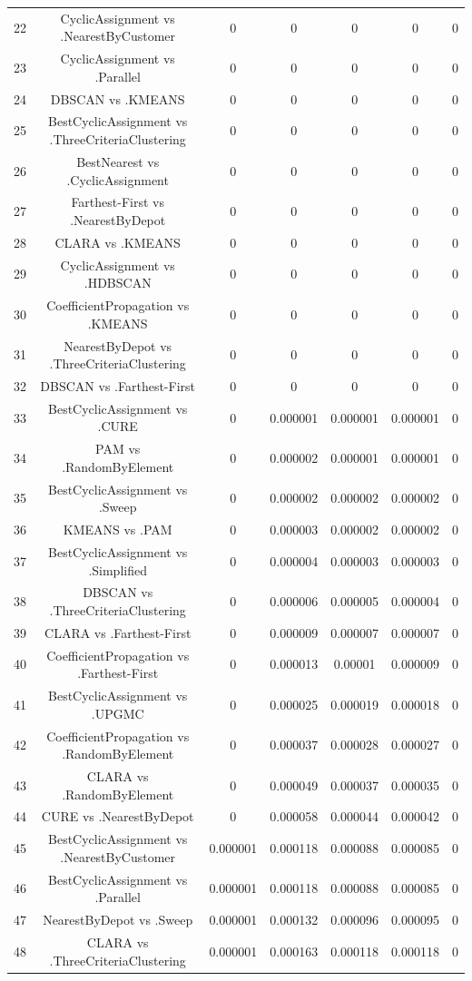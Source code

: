 \documentclass[a4paper,10pt]{article}
\begin{document}
\begin{landscape}
\begin{table}[!htp]
\begin{tabular}{ccccccc}
22&CyclicAssignment vs .NearestByCustomer&0&0&0&0&0\\
23&CyclicAssignment vs .Parallel&0&0&0&0&0\\
24&DBSCAN vs .KMEANS&0&0&0&0&0\\
25&BestCyclicAssignment vs .ThreeCriteriaClustering&0&0&0&0&0\\
26&BestNearest vs .CyclicAssignment&0&0&0&0&0\\
27&Farthest-First vs .NearestByDepot&0&0&0&0&0\\
28&CLARA vs .KMEANS&0&0&0&0&0\\
29&CyclicAssignment vs .HDBSCAN&0&0&0&0&0\\
30&CoefficientPropagation vs .KMEANS&0&0&0&0&0\\
31&NearestByDepot vs .ThreeCriteriaClustering&0&0&0&0&0\\
32&DBSCAN vs .Farthest-First&0&0&0&0&0\\
33&BestCyclicAssignment vs .CURE&0&0.000001&0.000001&0.000001&0\\
34&PAM vs .RandomByElement&0&0.000002&0.000001&0.000001&0\\
35&BestCyclicAssignment vs .Sweep&0&0.000002&0.000002&0.000002&0\\
36&KMEANS vs .PAM&0&0.000003&0.000002&0.000002&0\\
37&BestCyclicAssignment vs .Simplified&0&0.000004&0.000003&0.000003&0\\
38&DBSCAN vs .ThreeCriteriaClustering&0&0.000006&0.000005&0.000004&0\\
39&CLARA vs .Farthest-First&0&0.000009&0.000007&0.000007&0\\
40&CoefficientPropagation vs .Farthest-First&0&0.000013&0.00001&0.000009&0\\
41&BestCyclicAssignment vs .UPGMC&0&0.000025&0.000019&0.000018&0\\
42&CoefficientPropagation vs .RandomByElement&0&0.000037&0.000028&0.000027&0\\
43&CLARA vs .RandomByElement&0&0.000049&0.000037&0.000035&0\\
44&CURE vs .NearestByDepot&0&0.000058&0.000044&0.000042&0\\
45&BestCyclicAssignment vs .NearestByCustomer&0.000001&0.000118&0.000088&0.000085&0\\
46&BestCyclicAssignment vs .Parallel&0.000001&0.000118&0.000088&0.000085&0\\
47&NearestByDepot vs .Sweep&0.000001&0.000132&0.000096&0.000095&0\\
48&CLARA vs .ThreeCriteriaClustering&0.000001&0.000163&0.000118&0.000118&0\\

\end{tabular}
\end{table}
\end{landscape}
\end{document}
